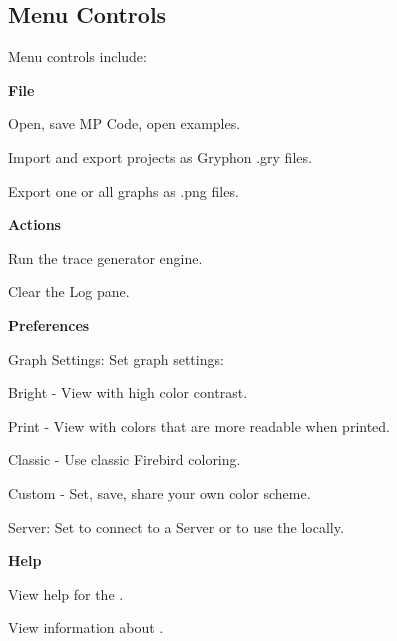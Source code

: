 \documentclass[11pt,fleqn]{article} %
\begin{document}
\subsection{Menu Controls}
Menu controls include:
\begin{compactitem}
\item \textbf{File}
  \begin{compactitem}
  \item Open, save MP Code, open examples.
  \item Import and export projects as Gryphon .gry files.
  \item Export one or all graphs as .png files.
  \end{compactitem}
\item \textbf{Actions}
  \begin{compactitem}
  \item Run the trace generator engine.
  \item Clear the Log pane.
  \end{compactitem}
\item \textbf{Preferences}
  \begin{compactitem}
  \item Graph Settings: Set graph settings:
    \begin{compactitem}
    \item Bright - View with high color contrast.
    \item Print - View with colors that are more readable when printed.
    \item Classic - Use classic Firebird coloring.
    \item Custom - Set, save, share your own color scheme.
    \end{compactitem}
  \item Server: Set to connect to a \gtg Server or to use the \gtg locally.
  \end{compactitem}
\item \textbf{Help}
  \begin{compactitem}
  \item View help for the \mpgt.
  \item View information about \mpgt.
  \end{compactitem}
\end{compactitem}
\end{document}
